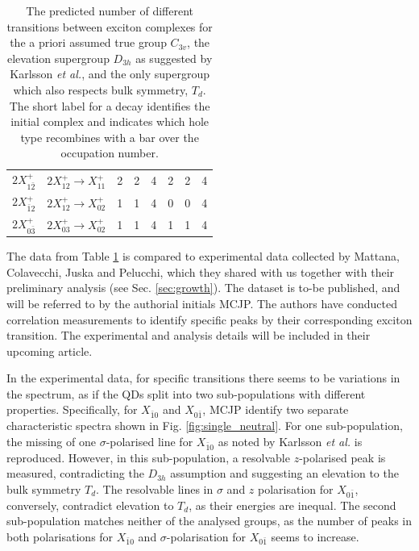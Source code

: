 \begin{table}
\begin{center}
\begin{tabular}{c c | c c c | c c c}
 $2X^+_{1\bar{2}}$ & $2X^+_{12}\to X^+_{11}$ & 2 & 2 & 4 & 2 & 2 & 4\\
 $2X^+_{\bar{1}2}$ & $2X^+_{12}\to X^+_{02}$ & 1 & 1 & 4 & 0 & 0 & 4\\
 $2X^+_{0\bar{3}}$ & $2X^+_{03}\to X^+_{02}$ & 1 & 1 & 4 & 1 & 1 & 4
\end{tabular}
\end{center}
\caption{The predicted number of different transitions between exciton complexes for the a priori assumed true group $C_{3v}$, the elevation supergroup $D_{3h}$ as suggested by Karlsson \textit{et al.}, and the only supergroup which also respects bulk symmetry, $T_d$. The short label for a decay identifies the initial complex and indicates which hole type recombines with a bar over the occupation number. \label{tab:predictions}}
\end{table}

The data from Table \ref{tab:predictions} is compared to experimental data collected by Mattana, Colavecchi, Juska and Pelucchi, which they shared with us together with their preliminary analysis (see Sec. \ref{sec:growth}). The dataset is to-be published, and will be referred to by the authorial initials MCJP. The authors have conducted correlation measurements to identify specific peaks by their corresponding exciton transition. The experimental and analysis details will be included in their upcoming article.

In the experimental data, for specific transitions there seems to be variations in the spectrum, as if the QDs split into two sub-populations with different properties. Specifically, for $X_{\bar{1}0}$ and $X_{0\bar{1}}$, MCJP identify two separate characteristic spectra shown in Fig. \ref{fig:single_neutral}. For one sub-population, the missing of one $\sigma$-polarised line for $X_{\bar{1}0}$ as noted by Karlsson \textit{et al.} is reproduced. However, in this sub-population, a resolvable $z$-polarised peak is measured, contradicting the $D_{3h}$ assumption and suggesting an elevation to the bulk symmetry $T_d$. The resolvable lines in $\sigma$ and $z$ polarisation for $X_{0\bar{1}}$, conversely, contradict elevation to $T_d$, as their energies are inequal. The second sub-population matches neither of the analysed groups, as the number of peaks in both polarisations for $X_{\bar{1}0}$ and $\sigma$-polarisation for $X_{0\bar{1}}$ seems to increase.

